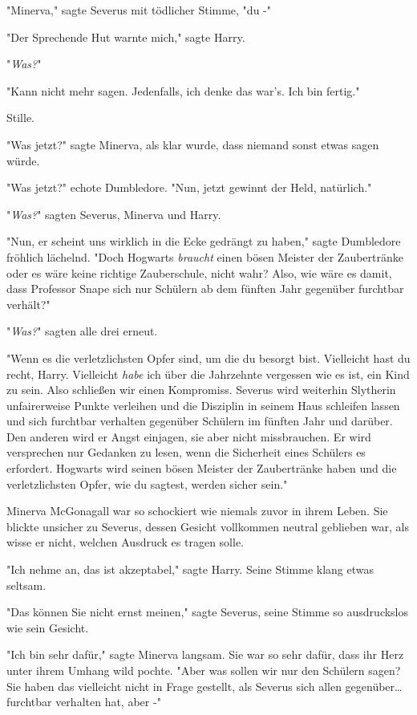 {"Minerva," sagte Severus mit tödlicher Stimme, "du -"

"Der Sprechende Hut warnte mich," sagte Harry.

"\emph{Was?}"

"Kann nicht mehr sagen. Jedenfalls, ich denke das war's. Ich bin fertig."

Stille.

"Was jetzt?" sagte Minerva, als klar wurde, dass niemand sonst etwas sagen würde.

"Was jetzt?" echote Dumbledore. "Nun, jetzt gewinnt der Held, natürlich."

"\emph{Was?}" sagten Severus, Minerva und Harry.

"Nun, er scheint uns wirklich in die Ecke gedrängt zu haben," sagte Dumbledore fröhlich lächelnd. "Doch Hogwarts \emph{braucht} einen bösen Meister der Zaubertränke oder es wäre keine richtige Zauberschule, nicht wahr? Also, wie wäre es damit, dass Professor Snape sich nur Schülern ab dem fünften Jahr gegenüber furchtbar verhält?"

"\emph{Was?}" sagten alle drei erneut.

"Wenn es die verletzlichsten Opfer sind, um die du besorgt bist. Vielleicht hast du recht, Harry. Vielleicht \emph{habe} ich über die Jahrzehnte vergessen wie es ist, ein Kind zu sein. Also schließen wir einen Kompromiss. Severus wird weiterhin Slytherin unfairerweise Punkte verleihen und die Disziplin in seinem Haus schleifen lassen und sich furchtbar verhalten gegenüber Schülern im fünften Jahr und darüber. Den anderen wird er Angst einjagen, sie aber nicht missbrauchen. Er wird versprechen nur Gedanken zu lesen, wenn die Sicherheit eines Schülers es erfordert. Hogwarts wird seinen bösen Meister der Zaubertränke haben und die verletzlichsten Opfer, wie du sagtest, werden sicher sein."

Minerva McGonagall war so schockiert wie niemals zuvor in ihrem Leben. Sie blickte unsicher zu Severus, dessen Gesicht vollkommen neutral geblieben war, als wisse er nicht, welchen Ausdruck es tragen solle.

"Ich nehme an, das ist akzeptabel," sagte Harry. Seine Stimme klang etwas seltsam.

"Das können Sie nicht ernst meinen," sagte Severus, seine Stimme so ausdruckslos wie sein Gesicht.

"Ich bin sehr dafür," sagte Minerva langsam. Sie war so sehr dafür, dass ihr Herz unter ihrem Umhang wild pochte. "Aber was sollen wir nur den Schülern sagen? Sie haben das vielleicht nicht in Frage gestellt, als Severus sich allen gegenüber… furchtbar verhalten hat, aber -"

}

